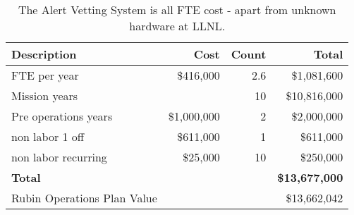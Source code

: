 \tiny \begin{longtable} {|l|r|r|r|} \caption{The Alert Vetting System is all FTE cost - apart from unknown hardware at LLNL. \label{tab:eliminate}}\\ 
\hline 
\textbf{Description}&\textbf{Cost}&\textbf{Count}&\textbf{Total} \\ \hline
{FTE per year}&{\$416,000}&{2.6}&{\$1,081,600} \\ \hline
{Mission years}&{}&{10}&{\$10,816,000} \\ \hline
{Pre operations years}&{\$1,000,000}&{2}&{\$2,000,000} \\ \hline
{non labor 1 off}&{\$611,000}&{1}&{\$611,000} \\ \hline
{non labor recurring}&{\$25,000}&{10}&{\$250,000} \\ \hline
\textbf{Total }&\textbf{}&\textbf{}&\textbf{\$13,677,000} \\ \hline
{Rubin Operations Plan Value}&{}&{}&{\$13,662,042} \\ \hline
\end{longtable} \normalsize
